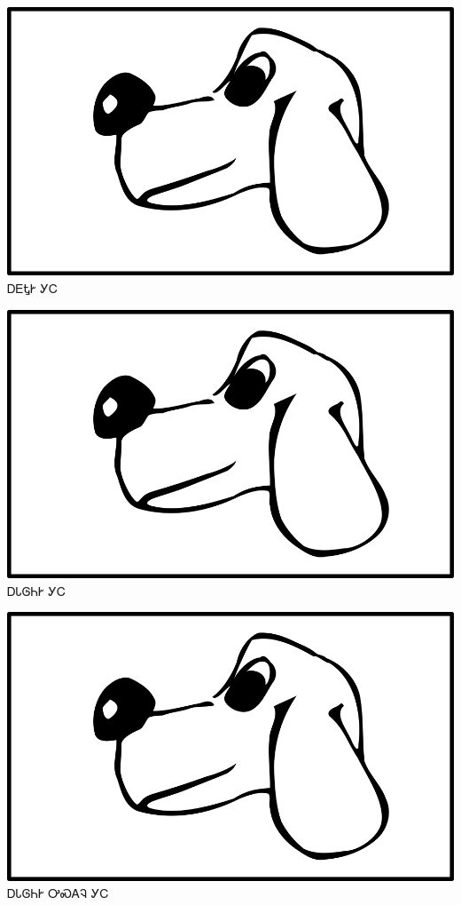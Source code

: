 \documentclass[avery5371]{flashcards}%
\begin{document}
\begin{flashcard}{
\includegraphics[width=0.95\columnwidth,height=.51\columnwidth,keepaspectratio]{../artwork/for-colors/gihli}
}
\Huge ᎠᎬᎿᎨ ᎩᏟ
\end{flashcard}

\begin{flashcard}{
\includegraphics[width=0.95\columnwidth,height=.51\columnwidth,keepaspectratio]{../artwork/for-colors/gihli}
}
\Huge ᎠᏓᎶᏂᎨ ᎩᏟ
\end{flashcard}

\begin{flashcard}{
\includegraphics[width=0.95\columnwidth,height=.51\columnwidth,keepaspectratio]{../artwork/for-colors/gihli}
}
\Huge ᎠᏓᎶᏂᎨ ᎤᏍᎪᎸ ᎩᏟ
\end{flashcard}
\end{document}
